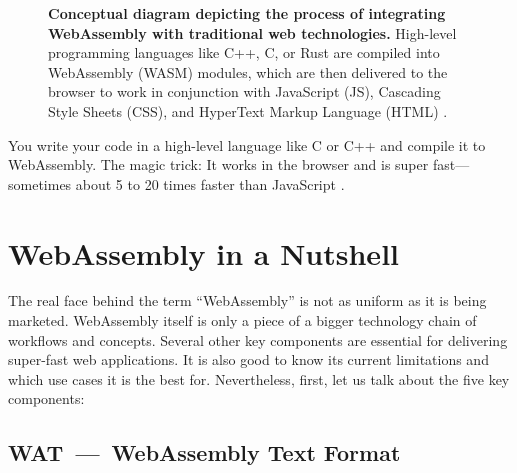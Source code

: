 \documentclass[10pt]{article}
\begin{document}
\begin{sloppypar}
  \begin{figure}[ht]
    \centering
    \caption[Conceptual diagram depicting the process of integrating WebAssembly with traditional web technologies.]{\textbf{Conceptual diagram depicting the process of integrating WebAssembly with traditional web technologies.} High-level programming languages like C++, C, or Rust are compiled into WebAssembly (WASM) modules, which are then delivered to the browser to work in conjunction with JavaScript (JS), Cascading Style Sheets (CSS), and HyperText Markup Language (HTML) \citep{logrocket_logrocket_nodate}.}
    \label{fig:wasm}
  \end{figure}

  You write your code in a high-level language like C or C++ and compile it to WebAssembly. The magic trick: It works in the browser and is super fast—sometimes about 5 to 20 times faster than JavaScript \citep{aboukhalil_how_2019}.

  \section{WebAssembly in a Nutshell}
  \label{sec:wasm-in-a-nutshell}

  The real face behind the term “WebAssembly” is not as uniform as it is being marketed. WebAssembly itself is only a piece of a bigger technology chain of workflows and concepts. Several other key components are essential for delivering super-fast web applications. It is also good to know its current limitations and which use cases it is the best for. Nevertheless, first, let us talk about the five key components:

  \subsection{WAT~—~WebAssembly Text Format}
  \label{sec:webassembly-text-format}


\end{sloppypar}
\end{document}
